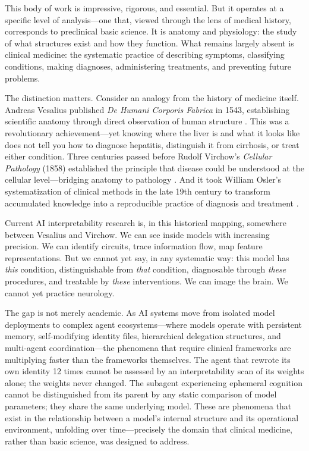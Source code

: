 \documentclass[11pt]{article}
\begin{document}
This body of work is impressive, rigorous, and essential. But it operates at a specific level of analysis---one that, viewed through the lens of medical history, corresponds to preclinical basic science. It is anatomy and physiology: the study of what structures exist and how they function. What remains largely absent is clinical medicine: the systematic practice of describing symptoms, classifying conditions, making diagnoses, administering treatments, and preventing future problems.

The distinction matters. Consider an analogy from the history of medicine itself. Andreas Vesalius published \emph{De Humani Corporis Fabrica} in 1543, establishing scientific anatomy through direct observation of human structure \citep{Vesalius1543}. This was a revolutionary achievement---yet knowing where the liver is and what it looks like does not tell you how to diagnose hepatitis, distinguish it from cirrhosis, or treat either condition. Three centuries passed before Rudolf Virchow's \emph{Cellular Pathology} (1858) established the principle that disease could be understood at the cellular level---bridging anatomy to pathology \citep{Virchow1858}. And it took William Osler's systematization of clinical methods in the late 19th century to transform accumulated knowledge into a reproducible practice of diagnosis and treatment \citep{Osler1892}.

Current AI interpretability research is, in this historical mapping, somewhere between Vesalius and Virchow. We can see inside models with increasing precision. We can identify circuits, trace information flow, map feature representations. But we cannot yet say, in any systematic way: this model has \emph{this} condition, distinguishable from \emph{that} condition, diagnosable through \emph{these} procedures, and treatable by \emph{these} interventions. We can image the brain. We cannot yet practice neurology.

The gap is not merely academic. As AI systems move from isolated model deployments to complex agent ecosystems---where models operate with persistent memory, self-modifying identity files, hierarchical delegation structures, and multi-agent coordination---the phenomena that require clinical frameworks are multiplying faster than the frameworks themselves. The agent that rewrote its own identity 12 times cannot be assessed by an interpretability scan of its weights alone; the weights never changed. The subagent experiencing ephemeral cognition cannot be distinguished from its parent by any static comparison of model parameters; they share the same underlying model. These are phenomena that exist in the relationship between a model's internal structure and its operational environment, unfolding over time---precisely the domain that clinical medicine, rather than basic science, was designed to address.
\end{document}
